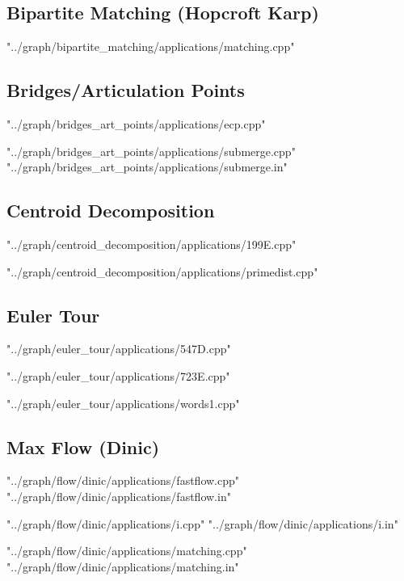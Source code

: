 \documentclass [12pt,onecolumn,oneside]{article}
\begin{document}
\subsection{ Bipartite Matching (Hopcroft Karp)}
 {"../graph/bipartite_matching/applications/matching.cpp"}
\newpage

\subsection{ Bridges/Articulation Points}
 {"../graph/bridges_art_points/applications/ecp.cpp"}
\newpage

 {"../graph/bridges_art_points/applications/submerge.cpp"}
 {"../graph/bridges_art_points/applications/submerge.in"}
\newpage

\subsection{ Centroid Decomposition}
 {"../graph/centroid_decomposition/applications/199E.cpp"}
\newpage

 {"../graph/centroid_decomposition/applications/primedist.cpp"}
\newpage

\subsection{ Euler Tour}
 {"../graph/euler_tour/applications/547D.cpp"}
\newpage

 {"../graph/euler_tour/applications/723E.cpp"}
\newpage

 {"../graph/euler_tour/applications/words1.cpp"}
\newpage

\subsection{ Max Flow (Dinic)}
 {"../graph/flow/dinic/applications/fastflow.cpp"}
 {"../graph/flow/dinic/applications/fastflow.in"}
\newpage

 {"../graph/flow/dinic/applications/i.cpp"}
 {"../graph/flow/dinic/applications/i.in"}
\newpage

 {"../graph/flow/dinic/applications/matching.cpp"}
 {"../graph/flow/dinic/applications/matching.in"}
\newpage
\end{document}
